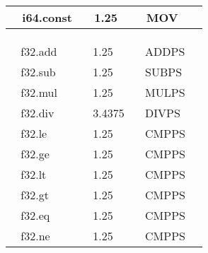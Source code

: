 \documentclass{article}
\begin{document}
\begin{table}
\begin{tabular}{|l|l|l|l|}
\hline
~ i64.const                                 & ~ 1.25                       & ~ MOV                                                &                       \\
\hline
                                            &                              &                                                      &                       \\
\hline
                                            &                              &                                                      &                       \\
\hline
\multicolumn{1}{l}{}                        & \multicolumn{1}{l}{}         & \multicolumn{1}{l}{}                                 & \multicolumn{1}{l}{}  \\
\multicolumn{1}{l}{~ f32.add}               & \multicolumn{1}{l}{~ 1.25}   & \multicolumn{1}{l}{~ ADDPS}                          & \multicolumn{1}{l}{}  \\
\multicolumn{1}{l}{~ f32.sub}               & \multicolumn{1}{l}{~ 1.25}   & \multicolumn{1}{l}{~ SUBPS}                          & \multicolumn{1}{l}{}  \\
\multicolumn{1}{l}{~ f32.mul}               & \multicolumn{1}{l}{~ 1.25}   & \multicolumn{1}{l}{~ MULPS}                          & \multicolumn{1}{l}{}  \\
\multicolumn{1}{l}{~ f32.div}               & \multicolumn{1}{l}{~ 3.4375} & \multicolumn{1}{l}{~ DIVPS}                          & \multicolumn{1}{l}{}  \\
\multicolumn{1}{l}{~ f32.le}                & \multicolumn{1}{l}{~ 1.25}   & \multicolumn{1}{l}{~ CMPPS}                          & \multicolumn{1}{l}{}  \\
\multicolumn{1}{l}{~ f32.ge}                & \multicolumn{1}{l}{~ 1.25}   & \multicolumn{1}{l}{~ CMPPS}                          & \multicolumn{1}{l}{}  \\
\multicolumn{1}{l}{~ f32.lt}                & \multicolumn{1}{l}{~ 1.25}   & \multicolumn{1}{l}{~ CMPPS}                          & \multicolumn{1}{l}{}  \\
\multicolumn{1}{l}{~ f32.gt}                & \multicolumn{1}{l}{~ 1.25}   & \multicolumn{1}{l}{~ CMPPS}                          & \multicolumn{1}{l}{}  \\
\multicolumn{1}{l}{~ f32.eq}                & \multicolumn{1}{l}{~ 1.25}   & \multicolumn{1}{l}{~ CMPPS}                          & \multicolumn{1}{l}{}  \\
\multicolumn{1}{l}{~ f32.ne}                & \multicolumn{1}{l}{~ 1.25}   & \multicolumn{1}{l}{~ CMPPS}                          & \multicolumn{1}{l}{}  \\

\end{tabular}
\end{table}
\end{document}
